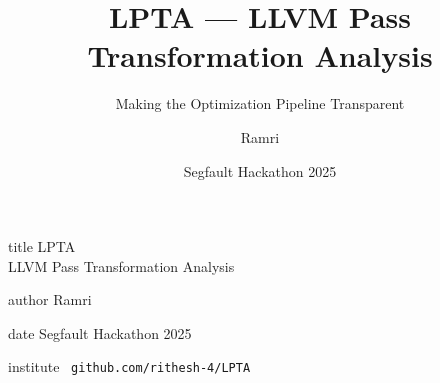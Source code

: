 \documentclass[aspectratio=169]{beamer}
\title{LPTA — LLVM Pass Transformation Analysis}
\subtitle{Making the Optimization Pipeline Transparent}
\author{Ramri}
\date{Segfault Hackathon 2025}
\institute{}
\begin{document}
\begin{frame}
  \vfill
  \centering
  \begin{beamercolorbox}[sep=8pt,center]{title}
    \LARGE LPTA\\[0.4em]
    \large LLVM Pass Transformation Analysis
  \end{beamercolorbox}
  \vspace{1.5em}
  \begin{beamercolorbox}[sep=4pt,center]{author}
     Ramri
  \end{beamercolorbox}
  \begin{beamercolorbox}[sep=4pt,center]{date}
     Segfault Hackathon 2025
  \end{beamercolorbox}
  \vspace{1em}
  \begin{beamercolorbox}[sep=4pt,center]{institute}
     \faGithub\ \texttt{github.com/rithesh-4/LPTA}
  \end{beamercolorbox}
  \vfill
\end{frame}
\end{document}
